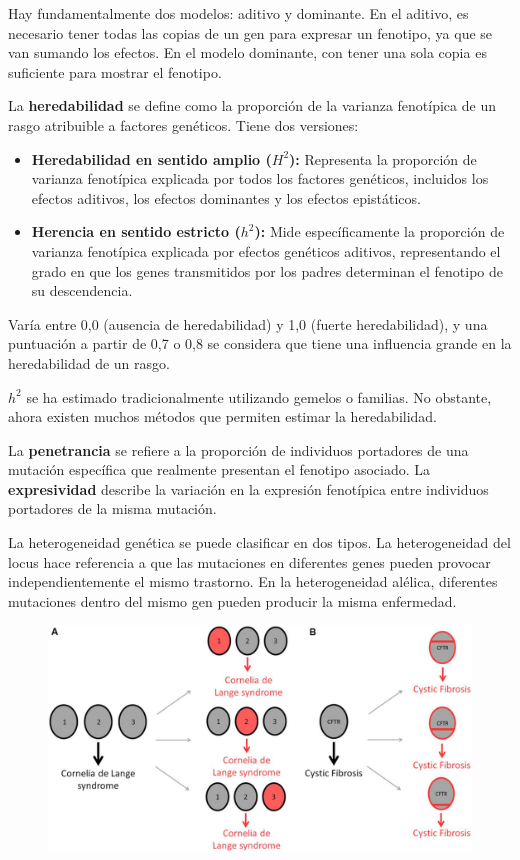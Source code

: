 Hay fundamentalmente dos modelos: aditivo y dominante. En el aditivo, es necesario tener todas las copias de un gen para expresar un fenotipo, ya que se van sumando los efectos. En el modelo dominante, con tener una sola copia es suficiente para mostrar el fenotipo.

La \textbf{heredabilidad} se define como la proporción de la varianza fenotípica de un rasgo atribuible a factores genéticos. Tiene dos versiones:
\begin{itemize}
\item \textbf{Heredabilidad en sentido amplio ($H^2$):} Representa la proporción de varianza fenotípica explicada por todos los factores genéticos, incluidos los efectos aditivos, los efectos dominantes y los efectos epistáticos.

\item \textbf{Herencia en sentido estricto ($h^2$):} Mide específicamente la proporción de varianza fenotípica explicada por efectos genéticos aditivos, representando el grado en que los genes transmitidos por los padres determinan el fenotipo de su descendencia.
\end{itemize}

Varía entre 0,0 (ausencia de heredabilidad) y 1,0 (fuerte heredabilidad), y una puntuación a partir de 0,7 o 0,8 se considera que tiene una influencia grande en la heredabilidad de un rasgo.

$h^2$ se ha estimado tradicionalmente utilizando gemelos o familias. No obstante, ahora existen muchos métodos que permiten estimar la heredabilidad.

La \textbf{penetrancia} se refiere a la proporción de individuos portadores de una mutación específica que realmente presentan el fenotipo asociado. La \textbf{expresividad} describe la variación en la expresión fenotípica entre individuos portadores de la misma mutación.

La heterogeneidad genética se puede clasificar en dos tipos. La heterogeneidad del locus hace referencia a que las mutaciones en diferentes genes pueden provocar independientemente el mismo trastorno. En la heterogeneidad alélica, 
diferentes mutaciones dentro del mismo gen pueden producir la misma enfermedad.
\begin{figure}[htbp]
\centering
\includegraphics[width = \textwidth]{figs/genetic-heterogeneity.png}
\end{figure}

